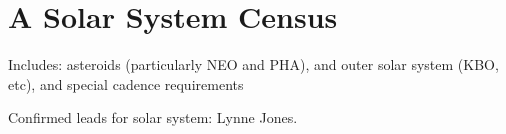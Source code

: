 \chapter[Solar System]{A Solar System Census}
\label{chp:solarsystem}


Includes: asteroids (particularly NEO and PHA), and outer solar system
(KBO, etc), and special cadence requirements

Confirmed leads for solar system: Lynne Jones.
